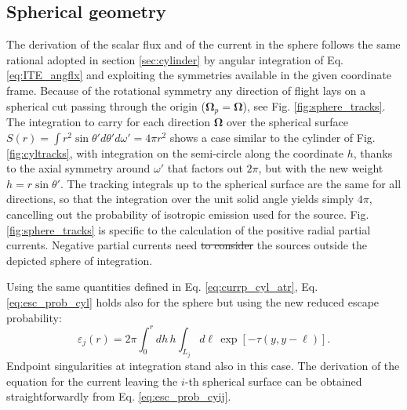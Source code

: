 \documentclass{ictt26}
\providecommand{\DIFadd}[1]{{\protect\color{blue}\uwave{#1}}} %
\providecommand{\DIFdel}[1]{{\protect\color{red}\sout{#1}}}                      %
\providecommand{\DIFaddbegin}{} %
\providecommand{\DIFaddend}{} %
\providecommand{\DIFdelbegin}{} %
\providecommand{\DIFdelend}{} %
\newcommand{\DIFscaledelfig}{0.5}
\newlength{\DIFdelgraphicswidth} %
\newlength{\DIFdelgraphicsheight} %
\newcommand{\DIFaddincludegraphics}[2][]{{\color{blue}\fbox{\DIFOincludegraphics[#1]{#2}}}} %
\newcommand{\DIFdelincludegraphics}[2][]{%
\sbox{\DIFdelgraphicsbox}{\DIFOincludegraphics[#1]{#2}}%
\settoboxwidth{\DIFdelgraphicswidth}{\DIFdelgraphicsbox} %
\settoboxtotalheight{\DIFdelgraphicsheight}{\DIFdelgraphicsbox} %
\scalebox{\DIFscaledelfig}{%
\parbox[b]{\DIFdelgraphicswidth}{\usebox{\DIFdelgraphicsbox}\\[-\baselineskip] \rule{\DIFdelgraphicswidth}{0em}}\llap{\resizebox{\DIFdelgraphicswidth}{\DIFdelgraphicsheight}{%
\setlength{\unitlength}{\DIFdelgraphicswidth}%
\begin{picture}(1,1)%
\thicklines\linethickness{2pt} %
{\color[rgb]{1,0,0}\put(0,0){\framebox(1,1){}}}%
{\color[rgb]{1,0,0}\put(0,0){\line( 1,1){1}}}%
{\color[rgb]{1,0,0}\put(0,1){\line(1,-1){1}}}%
\end{picture}%
}\hspace*{3pt}}} %
} %
\DeclareRobustCommand{\DIFaddbegin}{\DIFOaddbegin \let\includegraphics\DIFaddincludegraphics} %
\DeclareRobustCommand{\DIFaddend}{\DIFOaddend \let\includegraphics\DIFOincludegraphics} %
\DeclareRobustCommand{\DIFdelbegin}{\DIFOdelbegin \let\includegraphics\DIFdelincludegraphics} %
\DeclareRobustCommand{\DIFdelend}{\DIFOaddend \let\includegraphics\DIFOincludegraphics} %
\begin{document}
\subsection{Spherical geometry}
\label{sec:sphere}

The derivation of the scalar flux and of the current in the sphere follows the same rational adopted in section \ref{sec:cylinder} by angular integration of Eq. \ref{eq:ITE_angflx} and exploiting the symmetries available in the given coordinate frame. Because of the rotational symmetry any direction of flight lays on a spherical cut passing through the origin ($\mathbf{\Omega}_p = \mathbf{\Omega}$), see Fig. \ref{fig:sphere_tracks}. The integration to carry for each direction $\mathbf{\Omega}$ over the spherical surface $S(r) = \int{r^2\sin \theta' d\theta' d\omega'} = 4\pi r^2$ shows a case similar to the cylinder of Fig. \ref{fig:cyltracks}, with integration on the semi-circle along the coordinate $h$, thanks to the axial symmetry around $\omega'$ that factors out $2\pi$, but with the new weight $h = r\sin \theta'$. The tracking integrals up to the spherical surface are the same for all directions, so that the integration over the unit solid angle yields simply $4\pi$, cancelling out the probability of isotropic emission used for the source. Fig. \ref{fig:sphere_tracks} is specific to the calculation of the positive radial partial currents. Negative partial currents need \DIFdelbegin \DIFdel{to consider }\DIFdelend \DIFaddbegin \DIFadd{taking into account }\DIFaddend the sources outside the depicted sphere of integration.

Using the same quantities defined in Eq. \ref{eq:currp_cyl_atr}, Eq. \ref{eq:esc_prob_cyl} holds also for the sphere but using the new reduced escape probability:
\begin{equation}
\varepsilon_j(r) = 2\pi \int_0^r { dh\,
  h \int_{L_j}{d \ell \, \exp\left[-\tau( y, y - \ell )\right]}}.
\label{eq:esc_prob_sph}
\end{equation}
Endpoint singularities at integration stand also in this case. The derivation of the equation for the current leaving the $i$-th spherical surface can be obtained straightforwardly from Eq. \ref{eq:esc_prob_cyij}.
\end{document}
